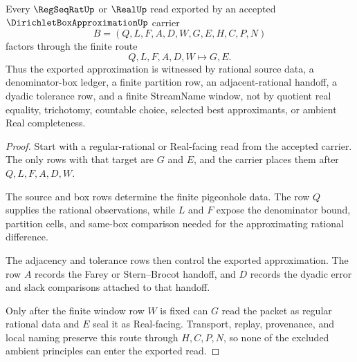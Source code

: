 \begin{theorem}
\label{thm:dirichlet-box-approximation-finite-pigeonhole-route}
Every $\RegSeqRatUp$ or $\RealUp$ read exported by an accepted $\DirichletBoxApproximationUp$ carrier
$$
B=(Q,L,F,A,D,W,G,E,H,C,P,N)
$$
factors through the finite route
$$
Q,L,F,A,D,W \longmapsto G,E .
$$
Thus the exported approximation is witnessed by rational source data, a denominator-box ledger, a finite partition row, an adjacent-rational handoff, a dyadic tolerance row, and a finite StreamName window, not by quotient real equality, trichotomy, countable choice, selected best approximants, or ambient Real completeness.
\end{theorem}
\begin{proof}
Start with a regular-rational or Real-facing read from the accepted carrier. The only rows with that target are $G$ and $E$, and the carrier places them after $Q,L,F,A,D,W$.

The source and box rows determine the finite pigeonhole data. The row $Q$ supplies the rational observations, while $L$ and $F$ expose the denominator bound, partition cells, and same-box comparison needed for the approximating rational difference.

The adjacency and tolerance rows then control the exported approximation. The row $A$ records the Farey or Stern--Brocot handoff, and $D$ records the dyadic error and slack comparisons attached to that handoff.

Only after the finite window row $W$ is fixed can $G$ read the packet as regular rational data and $E$ seal it as Real-facing. Transport, replay, provenance, and local naming preserve this route through $H,C,P,N$, so none of the excluded ambient principles can enter the exported read.
\end{proof}



